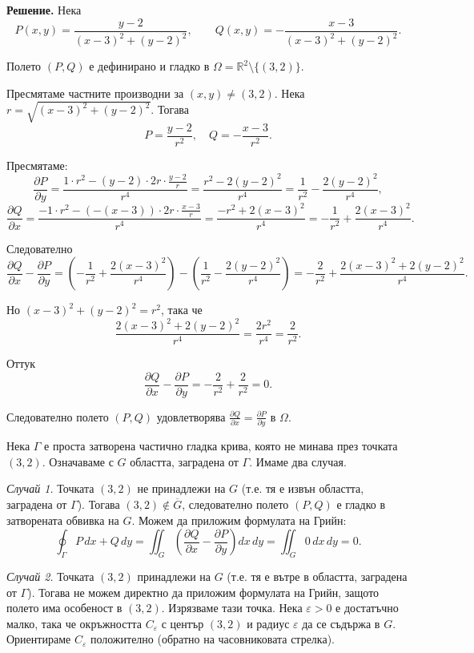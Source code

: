 \documentclass[10pt]{article}
\begin{document}
\textbf{Решение.} 
Нека 
\[
P(x,y) = \frac{y-2}{(x-3)^2+(y-2)^2}, \qquad 
Q(x,y) = -\frac{x-3}{(x-3)^2+(y-2)^2}.
\]

Полето $(P,Q)$ е дефинирано и гладко в $\Omega = \mathbb{R}^2 \setminus \{(3,2)\}$. 

Пресмятаме частните производни за $(x,y) \neq (3,2)$. Нека $r = \sqrt{(x-3)^2+(y-2)^2}$. Тогава
\[
P = \frac{y-2}{r^2}, \quad Q = -\frac{x-3}{r^2}.
\]

Пресмятаме:
\[
\frac{\partial P}{\partial y} = \frac{1 \cdot r^2 - (y-2) \cdot 2r \cdot \frac{y-2}{r}}{r^4} = \frac{r^2 - 2(y-2)^2}{r^4} = \frac{1}{r^2} - \frac{2(y-2)^2}{r^4},
\]
\[
\frac{\partial Q}{\partial x} = \frac{-1 \cdot r^2 - (-(x-3)) \cdot 2r \cdot \frac{x-3}{r}}{r^4} = \frac{-r^2 + 2(x-3)^2}{r^4} = -\frac{1}{r^2} + \frac{2(x-3)^2}{r^4}.
\]

Следователно
\[
\frac{\partial Q}{\partial x} - \frac{\partial P}{\partial y} = \left(-\frac{1}{r^2} + \frac{2(x-3)^2}{r^4}\right) - \left(\frac{1}{r^2} - \frac{2(y-2)^2}{r^4}\right) = -\frac{2}{r^2} + \frac{2(x-3)^2 + 2(y-2)^2}{r^4}.
\]

Но $(x-3)^2+(y-2)^2 = r^2$, така че
\[
\frac{2(x-3)^2 + 2(y-2)^2}{r^4} = \frac{2r^2}{r^4} = \frac{2}{r^2}.
\]

Оттук
\[
\frac{\partial Q}{\partial x} - \frac{\partial P}{\partial y} = -\frac{2}{r^2} + \frac{2}{r^2} = 0.
\]

Следователно полето $(P,Q)$ удовлетворява $\frac{\partial Q}{\partial x} = \frac{\partial P}{\partial y}$ в $\Omega$.

Нека $\Gamma$ е проста затворена частично гладка крива, която не минава през точката $(3,2)$. Означаваме с $G$ областта, заградена от $\Gamma$. Имаме два случая.

\textit{Случай 1.} Точката $(3,2)$ не принадлежи на $G$ (т.е. тя е извън областта, заградена от $\Gamma$). 
Тогава $(3,2) \notin \overline{G}$, следователно полето $(P,Q)$ е гладко в затворената обвивка на $G$. Можем да приложим формулата на Грийн:
\[
\oint_\Gamma P\,dx + Q\,dy = \iint_G \left( \frac{\partial Q}{\partial x} - \frac{\partial P}{\partial y} \right) dx\,dy = \iint_G 0 \,dx\,dy = 0.
\]

\textit{Случай 2.} Точката $(3,2)$ принадлежи на $G$ (т.е. тя е вътре в областта, заградена от $\Gamma$). 
Тогава не можем директно да приложим формулата на Грийн, защото полето има особеност в $(3,2)$. Изрязваме тази точка. Нека $\varepsilon > 0$ е достатъчно малко, така че окръжността $C_\varepsilon$ с център $(3,2)$ и радиус $\varepsilon$ да се съдържа в $G$. Ориентираме $C_\varepsilon$ положително (обратно на часовниковата стрелка). 
\end{document}
